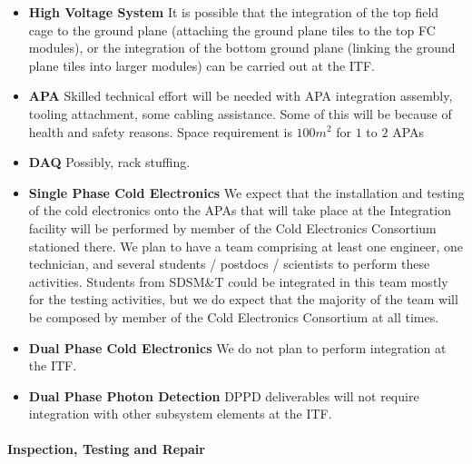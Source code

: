 \begin{itemize}
  \item {\bf High Voltage System} It is possible that the integration of the top field cage to the 
ground plane (attaching the ground plane tiles to the top FC modules), or the integration of the 
bottom ground plane (linking the ground plane tiles into larger modules) can be carried out at the 
ITF.
  \item {\bf APA} Skilled technical effort will be needed with APA integration assembly, tooling 
attachment, some cabling assistance. Some of this will be because of health and safety reasons. Space requirement is $100 m^2$ for $1$ to $2$ APAs
  \item {\bf DAQ} Possibly, rack stuffing.
  \item {\bf Single Phase Cold Electronics} We expect that the installation and testing of 
the cold electronics onto the APAs that will take place at the Integration facility will be performed by 
member of the Cold Electronics Consortium stationed there. We plan to have a team comprising at 
least one engineer, one technician, and several students / postdocs / scientists to perform these 
activities. Students from SDSM\&T could be integrated in this team mostly for the testing activities, 
but we do expect that the majority of the team will be composed by member of the Cold Electronics 
Consortium at all times.
   \item {\bf Dual Phase Cold Electronics} We do not plan to perform integration at the ITF.
   \item {\bf Dual Phase Photon Detection} DPPD deliverables will not require integration with 
other subsystem elements at the ITF.
\end{itemize}

\paragraph{\bf Inspection, Testing and Repair}

